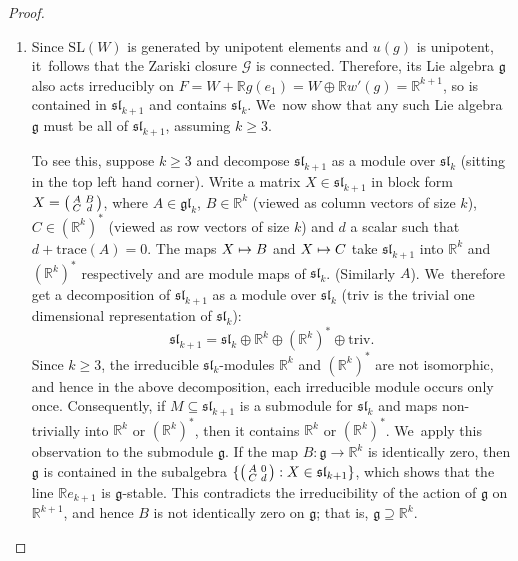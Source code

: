 \documentclass[JEP,XML,SOM,Unicode,published]{cedram}
\newenvironment{smallpmatrix}{\big(\begin{smallmatrix}}{\end{smallmatrix}\big)}
\def\mto{\mathchoice{\longmapsto}{\mapsto}{\mapsto}{\mapsto}}
\theoremstyle{definition}
\newcommand{\field}[1]{\mathbb{#1}}
\newcommand{\R}{\field{R}}
\newcommand{\SL}{\mathrm{SL}}
\newcommand{\frg}{\mathfrak g}
\begin{document}
\begin{proof}
\begin{enumerate}
After replacing $e$ by a scalar if necessary, we~may assume that $e$ maps to $g(e_1)$ in $F/W$; that is, $g(e_1)=e+w$ for some $w\in W$. In other words, $g(e_1)=(w,e)$. But $g(e_1)=(w(g),w'(g))$ in $\R ^n=W\oplus W'$. Hence $e=w'(g)$, and $(u(g)-1)w'(g)=0$ by the preceding paragraph. This contradicts the assumption that $g$ lies in the open set~$U$. Hence the case $W\cap E=0$ cannot arise.

\smallskip
\item
Since $\SL(W)$ is generated by unipotent elements and $u(g)$ is unipotent, it~follows that the Zariski closure $\mathcal G$ is connected. Therefore, its Lie algebra $\frg$ also acts irreducibly on $F=W+\R g(e_1)= W\oplus \R w'(g)=\R^{k+1}$, so is contained in $\mathfrak {sl}_{k+1}$ and contains $\mathfrak {sl}_k$. We~now show that any such Lie algebra $\frg$ must be all of $\mathfrak {sl}_{k+1}$, assuming $k\geq 3$.

To see this, suppose $k\geq 3$ and decompose $\mathfrak{sl}_{k+1}$ as a module over $\mathfrak{sl}_k$ (sitting in the top left hand corner). Write a matrix $X\in \mathfrak{sl}_{k+1}$ in block form $X=\begin{smallpmatrix} A & B \\ C & d\end{smallpmatrix}$, where $A\in \mathfrak{gl}_k$, $B\in \R ^k$ (viewed as column vectors of size $k$), $C\in (\R ^k)^*$ (viewed as row vectors of size $k$) and $d$ a scalar such that $d+\mathrm{trace}(A)=0$. The maps $X\mto B$ and $X\mto C$ take $\mathfrak{sl}_{k+1}$ into $\R ^k$ and $(\R ^k)^*$ respectively and are module maps of $\mathfrak{sl}_k$. (Similarly $A$). We~therefore get a decomposition of $\mathfrak{sl}_{k+1}$ as a module over $\mathfrak{sl}_k$ ($\mathrm{triv}$ is the trivial one dimensional representation of $\mathfrak{sl}_k$):
\[
\mathfrak{sl}_{k+1}= \mathfrak{sl}_k \oplus \R ^k \oplus (\R ^k)^* \oplus \mathrm{triv}.
\]
Since $k\geq 3$, the irreducible $\mathfrak{sl}_k$-modules $\R ^k$ and $(\R ^k)^*$ are not isomorphic, and hence in the above
decomposition, each irreducible module occurs only once. Consequently, if $M\subseteq \mathfrak{sl}_{k+1}$ is a submodule for $\mathfrak{sl}_k$ and maps non-trivially into $\R ^k$ or $(\R ^k)^*$, then it contains $\R ^k$ or $(\R ^k)^*$. We~apply this observation to the submodule $\frg$. If the map $B: \frg \to \R ^k$ is identically zero, then $\frg$ is contained in the subalgebra $\{
\begin{smallpmatrix} A & 0 \\ C &d\end{smallpmatrix}: X\in \mathfrak{sl}_{k+1}\}$, which shows that the line $\R e_{k+1}$ is $\frg$-stable. This contradicts the irreducibility of the action of $\frg$ on $\R ^{k+1}$, and hence $B$ is not identically zero on $\frg$; that is, $\frg \supseteq \R ^k$.


\end{enumerate}
\end{proof}
\end{document}

